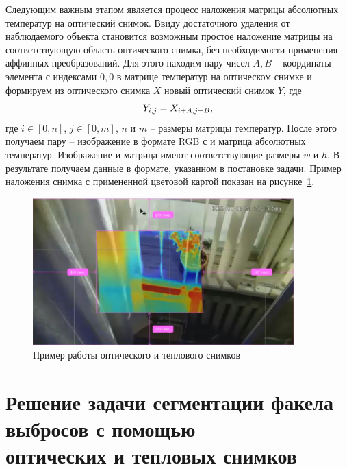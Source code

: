 \documentclass[14pt, a4paper]{extreport}
\begin{document}
	Следующим важным этапом является процесс наложения матрицы абсолютных температур на оптический снимок. Ввиду достаточного удаления от наблюдаемого объекта становится возможным простое наложение матрицы на соответствующую область оптического снимка, без необходимости применения аффинных преобразований. 
	Для этого находим пару чисел $A, B$ -- координаты элемента с индексами $0, 0$ в матрице температур на оптическом снимке и формируем из оптического снимка $X$ новый оптический снимок $Y$, где
	\vspace*{-0.3cm}
	\begin{equation*}
		Y_{i,j} = X_{i + A,j + B},
		\label{eq:nalozhenie}
		\vspace*{-0.3cm}
	\end{equation*}
	где $i \in [0, n]$, $j \in [0, m]$, $n$ и $m$ -- размеры матрицы температур. После этого получаем пару -- изображение в формате RGB с и матрица абсолютных температур. Изображение и матрица имеют соответствующие размеры $w$ и $h$. В результате получаем данные в формате, указанном в постановке задачи. Пример наложения снимка с примененной цветовой картой показан на рисунке~\ref{fig:nalozhenie_examp}.
	\begin{figure}[h!]
		\centering
		\includegraphics[width = 0.9\textwidth]{image/chapter_2/nalozhenie_examp}	
		\caption{Пример работы оптического и теплового снимков}
		\label{fig:nalozhenie_examp}
	\end{figure}
\section[\vspace*{-0.22cm}Решение задачи сегментации факела выбросов с помощью \\ \hspace*{-0.75cm}оптических и тепловых снимков]{\vspace*{-0.22cm}Решение задачи сегментации факела выбросов с помощью \\ \hspace*{-2.05cm}оптических и тепловых снимков}
\end{document}
